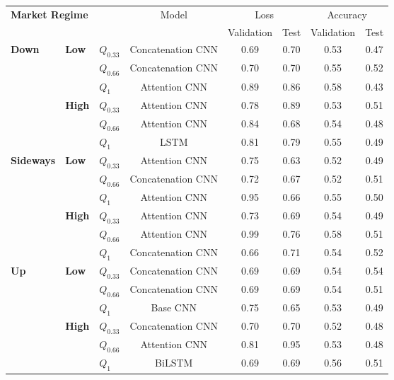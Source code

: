 \begin{tabular}{lll|c|cc|cc}
    \toprule
    \multicolumn{3}{l|}{\multirow{2}{*}{\textbf{Market Regime}}} & \multirow{2}{*}{Model} & \multicolumn{2}{c|}{Loss} & \multicolumn{2}{c}{Accuracy}  \\
    \multicolumn{3}{c|}{} & & Validation & Test & Validation & Test \\
    \midrule
    \multirow{6}{*}{\textbf{Down}}     & \multirow{3}{*}{\textbf{Low}}  & \textbf{$Q_{0.33}$} & Concatenation CNN & 0.69 & 0.70         & 0.53       & 0.47             \\
    &                                & \textbf{$Q_{0.66}$} & Concatenation CNN & 0.70 & 0.70 & 0.55 & 0.52 \\
    &                                & \textbf{$Q_{1}$}    & Attention CNN     & 0.89 & 0.86 & 0.58 & 0.43 \\
    & \multirow{3}{*}{\textbf{High}} & \textbf{$Q_{0.33}$} & Attention CNN     & 0.78 & 0.89 & 0.53 & 0.51 \\
    &                                & \textbf{$Q_{0.66}$} & Attention CNN     & 0.84 & 0.68 & 0.54 & 0.48 \\
    &                                & \textbf{$Q_{1}$}    & LSTM              & 0.81 & 0.79 & 0.55 & 0.49 \\
    \midrule
    \multirow{6}{*}{\textbf{Sideways}} & \multirow{3}{*}{\textbf{Low}}  & \textbf{$Q_{0.33}$} & Attention CNN     & 0.75 & 0.63         & 0.52       & 0.49             \\
    &                                & \textbf{$Q_{0.66}$} & Concatenation CNN & 0.72 & 0.67 & 0.52 & 0.51 \\
    &                                & \textbf{$Q_{1}$}    & Attention CNN     & 0.95 & 0.66 & 0.55 & 0.50 \\
    & \multirow{3}{*}{\textbf{High}} & \textbf{$Q_{0.33}$} & Attention CNN     & 0.73 & 0.69 & 0.54 & 0.49 \\
    &                                & \textbf{$Q_{0.66}$} & Attention CNN     & 0.99 & 0.76 & 0.58 & 0.51 \\
    &                                & \textbf{$Q_{1}$}    & Concatenation CNN & 0.66 & 0.71 & 0.54 & 0.52 \\
    \midrule
    \multirow{6}{*}{\textbf{Up}}       & \multirow{3}{*}{\textbf{Low}}  & \textbf{$Q_{0.33}$} & Concatenation CNN & 0.69 & 0.69 & 0.54       & 0.54             \\
    &                                & \textbf{$Q_{0.66}$} & Concatenation CNN & 0.69 & 0.69 & 0.54 & 0.51 \\
    &                                & \textbf{$Q_{1}$}    & Base CNN          & 0.75 & 0.65 & 0.53 & 0.49 \\
    & \multirow{3}{*}{\textbf{High}} & \textbf{$Q_{0.33}$} & Concatenation CNN & 0.70 & 0.70 & 0.52 & 0.48 \\
    &                                & \textbf{$Q_{0.66}$} & Attention CNN     & 0.81 & 0.95 & 0.53 & 0.48 \\
    &                                & \textbf{$Q_{1}$}    & BiLSTM            & 0.69 & 0.69 & 0.56 & 0.51 \\
    \bottomrule
\end{tabular}